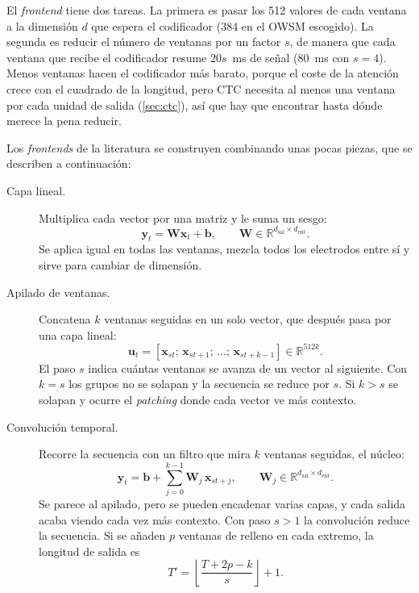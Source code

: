 El \textit{frontend} tiene dos tareas. La primera es pasar los 512 valores de cada ventana a la dimensión $d$ que espera el codificador (384 en el OWSM escogido). La segunda es reducir el número de ventanas por un factor $s$, de manera que cada ventana que recibe el codificador resume $20s$~ms de señal (\SI{80}{\milli\second} con $s = 4$). Menos ventanas hacen el codificador más barato, porque el coste de la atención crece con el cuadrado de la longitud, pero CTC necesita al menos una ventana por cada unidad de salida (\cref{sec:ctc}), así que hay que encontrar hasta dónde merece la pena reducir.

Los \textit{frontends} de la literatura se construyen combinando unas pocas piezas, que se describen a continuación:

\begin{description}
  \item[Capa lineal.] Multiplica cada vector por una matriz y le suma un sesgo:
  \begin{equation}
    \mathbf{y}_t = \mathbf{W}\mathbf{x}_t + \mathbf{b}, \qquad \mathbf{W} \in \mathbb{R}^{d_{\mathrm{sal}} \times d_{\mathrm{ent}}}.
    \label{eq:lineal}
  \end{equation}
  Se aplica igual en todas las ventanas, mezcla todos los electrodos entre sí y sirve para cambiar de dimensión.

  \item[Apilado de ventanas.] Concatena $k$ ventanas seguidas en un solo vector, que después pasa por una capa lineal:
  \begin{equation}
    \mathbf{u}_{t} = [\mathbf{x}_{st};\, \mathbf{x}_{st+1};\, \dots;\, \mathbf{x}_{st+k-1}] \in \mathbb{R}^{512k}.
    \label{eq:apilado}
  \end{equation}
  El paso $s$ indica cuántas ventanas se avanza de un vector al siguiente. Con $k = s$ los grupos no se solapan y la secuencia se reduce por $s$. Si $k > s$ se solapan y ocurre el \textit{patching} donde cada vector ve más contexto.

  \item[Convolución temporal.] Recorre la secuencia con un filtro que mira $k$ ventanas seguidas, el núcleo:
  \begin{equation}
    \mathbf{y}_t = \mathbf{b} + \sum_{j=0}^{k-1} \mathbf{W}_j\, \mathbf{x}_{st+j}, \qquad \mathbf{W}_j \in \mathbb{R}^{d_{\mathrm{sal}} \times d_{\mathrm{ent}}}.
    \label{eq:conv1d}
  \end{equation}
  Se parece al apilado, pero se pueden encadenar varias capas, y cada salida acaba viendo cada vez más contexto. Con paso $s > 1$ la convolución reduce la secuencia. Si se añaden $p$ ventanas de relleno en cada extremo, la longitud de salida es
  \begin{equation}
    T' = \left\lfloor \frac{T + 2p - k}{s} \right\rfloor + 1.
    \label{eq:conv-longitud}
  \end{equation}


\end{description}

